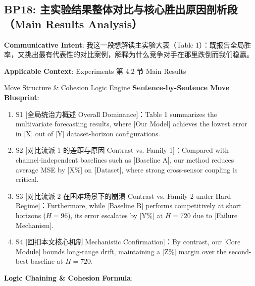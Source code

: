 \subsection{BP18: 主实验结果整体对比与核心胜出原因剖析段（Main Results Analysis）}\label{sec:bp:BP18}
\noindent\textbf{\color{AcadNavy}Communicative Intent}: 我这一段想解读主实验大表（Table 1）：既报告全局胜率，又挑出最有代表性的对比案例，解释为什么竞争对手在那里跌倒而我们稳赢。\par\vspace{2pt}
\noindent\textbf{\color{AcadSlate}Applicable Context}: Experiments 第 4.2 节 Main Results\par\vspace{4pt}
\begin{ConceptBox}{Move Structure \& Cohesion Logic Engine}
\textbf{Sentence-by-Sentence Move Blueprint}:
\begin{enumerate}[label=\textbf{\color{AcadNavy}S\arabic*.}, leftmargin=2em, itemsep=2pt]
  \item S1 [全局统治力概述 Overall Dominance]：Table 1 summarizes the multivariate forecasting results, where [Our Model] achieves the lowest error in [X] out of [Y] dataset-horizon configurations.
  \item S2 [对比流派 1 的差距与原因 Contrast vs. Family 1]：Compared with channel-independent baselines such as [Baseline A], our method reduces average MSE by [X\%] on [Dataset], where strong cross-sensor coupling is critical.
  \item S3 [对比流派 2 在困难场景下的崩溃 Contrast vs. Family 2 under Hard Regime]：Furthermore, while [Baseline B] performs competitively at short horizons ($H=96$), its error escalates by [Y\%] at $H=720$ due to [Failure Mechanism].
  \item S4 [回扣本文核心机制 Mechanistic Confirmation]：By contrast, our [Core Module] bounds long-range drift, maintaining a [Z\%] margin over the second-best baseline at $H=720$.
\end{enumerate}\par\vspace{4pt}
\textbf{Logic Chaining \& Cohesion Formula}:\par{}
\end{ConceptBox}
